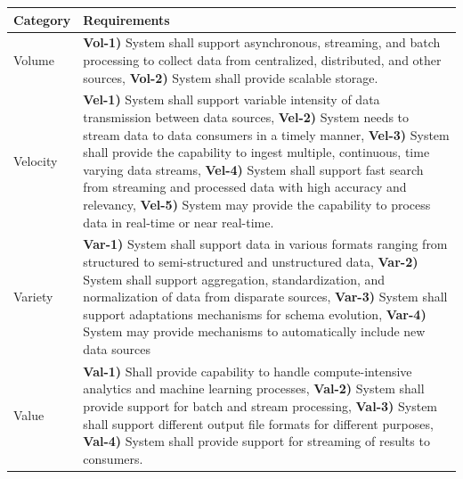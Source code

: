 \documentclass[a4paper,11pt]{article}
\begin{document}
    \begin{table}[h!t]
    \centering
    \renewcommand*{\arraystretch}{1.8}
    \begin{tabular}{|l|p{12cm}|}
	\hline
	\textbf{Category} & \textbf{Requirements} \\
        \hline

        Volume &

        \textbf{Vol-1)} System shall support asynchronous, streaming, and batch processing to collect data from centralized, distributed, and other sources, \textbf{Vol-2)} System shall provide scalable storage. 
        \\
        \hline
        Velocity & 
        
        \textbf{Vel-1)} System shall support variable intensity of data transmission between data sources, \textbf{Vel-2)} System needs to stream data to data consumers in a timely manner, \textbf{Vel-3)} System shall provide the capability to ingest multiple, continuous, time varying data streams, \textbf{Vel-4)} System shall support fast search from streaming and processed data with high accuracy and relevancy, \textbf{Vel-5)} System may provide the capability to process data in real-time or near real-time. 
        \\ 

        \hline

        Variety & 

        \textbf{Var-1)} System shall support data in various formats ranging from structured to semi-structured and unstructured data, \textbf{Var-2)} System shall support aggregation, standardization, and normalization of data from disparate sources, \textbf{Var-3)} System shall support adaptations mechanisms for schema evolution, \textbf{Var-4)} System may provide mechanisms to automatically include new data sources 
        \\

        \hline

        Value & 
        
        \textbf{Val-1)} Shall provide capability to handle compute-intensive analytics and machine learning processes, \textbf{Val-2)} System shall provide support for batch and stream processing, \textbf{Val-3)} System shall support different output file formats for different purposes, \textbf{Val-4)} System shall provide support for streaming of results to consumers.
        \\

        \hline


\end{tabular}
\end{table}
\end{document}
